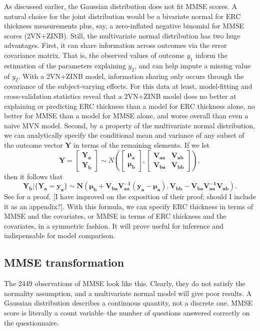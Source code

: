 \documentclass[12pt]{article}
\begin{document}
As discussed earlier, the Gaussian distribution does not fit MMSE scores. A natural choice for the joint distribution would be a bivariate normal for ERC thickness measurements plus, say, a zero-inflated negative binomial for MMSE scores (2VN+ZINB). Still, the multivariate normal distribution has two huge advantages. First, it can share information across outcomes via the error covariance matrix. That is, the observed values of outcome $y_1$ inform the estimation of the parameters explaining $y_2$, and can help impute a missing value of $y_2$. With a 2VN+ZINB model, information sharing only occurs through the covariance of the subject-varying effects. For this data at least, model-fitting and cross-validation statistics reveal that a 2VN+ZINB model does no better at explaining or predicting ERC thickness than a model for ERC thickness alone, no better for MMSE than a model for MMSE alone, and worse overall than even a naive MVN model. Second, by a property of the multivariate normal distribution, we can analytically specify the conditional mean and variance of any subset of the outcome vector $\boldsymbol{Y}$ in terms of the remaining elements. If we let 
$$ \boldsymbol{Y} = \boldsymbol{ \begin{bmatrix} Y_a \\ Y_b \end{bmatrix} } \sim
N \boldsymbol{ \left(
\begin{bmatrix} \mu_{a} \\ \mu_{b} \end{bmatrix},
\begin{bmatrix} V_{aa} & V_{ab} \\ V_{ba} & V_{bb} \end{bmatrix}
\right) }, $$
then it follows that
$$ \boldsymbol{ Y_b | \{ Y_a = y_a \} \sim 
N( \mu_b + V_{ba} V^{-1}_{aa}(y_a - \mu_a), V_{bb} - V_{ba} V^{-1}_{aa} V_{ab} ) }.$$
See \citet{seber2012linear} for a proof. {\color{teal} [I have improved on the exposition of their proof; should I include it as an appendix?].} With this formula, we can specify ERC thickness in terms of MMSE and the covariates, or MMSE in terms of ERC thickness and the covariates, in a symmetric fashion. It will prove useful for inference and indispensable for model comparison. 

\pagebreak
\subsection{MMSE transformation}

The 2449 observations of MMSE look like this. Clearly, they do not satisfy the normality assumption, and a multivariate normal model will give poor results. A Gaussian distribution describes a continuous quantity, not a discrete one. MMSE score is literally a count variable--the number of questions answered correctly on the questionnaire. 
\end{document}
